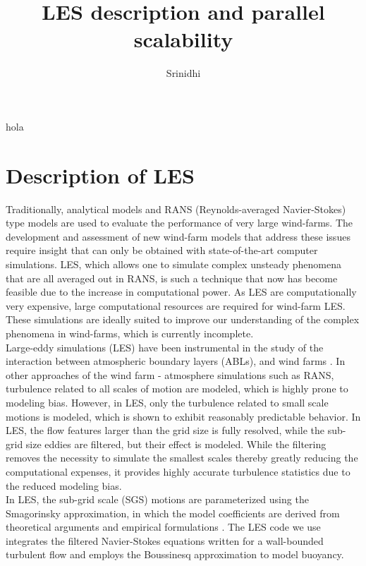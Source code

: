 \documentclass[output=paper,colorlinks,citecolor=brown]{langscibook}
\author{Srinidhi}
\title{LES description and parallel scalability}
\begin{document}
\maketitle
hola
\section{Description of LES}
Traditionally, analytical models and RANS (Reynolds-averaged Navier-Stokes) type models are used to evaluate the performance of very large wind-farms. The development and assessment of new wind-farm models that address these issues require insight that can only be obtained with state-of-the-art computer simulations. LES, which allows one to simulate complex unsteady phenomena that are all averaged out in RANS, is such a technique that now has become feasible due to the increase in computational power. As LES are computationally very expensive, large computational resources are required for wind-farm LES. These simulations are ideally suited to improve our understanding of the complex phenomena in wind-farms, which is currently incomplete.\\ 

Large-eddy simulations (LES) have been instrumental in the study of the interaction between atmospheric boundary layers (ABLs), and wind farms \citep{ste17, por20}. In other approaches of the wind farm - atmosphere simulations such as RANS, turbulence related to all scales of motion are modeled, which is highly prone to modeling bias. However, in LES, only the turbulence related to small scale motions is modeled, which is shown to exhibit reasonably predictable behavior. In LES, the flow features larger than the grid size is fully resolved, while the sub-grid size eddies are filtered, but their effect is modeled. While the filtering removes the necessity to simulate the smallest scales thereby greatly reducing the computational expenses, it provides highly accurate turbulence statistics due to the reduced modeling bias.\\
In LES, the sub-grid scale (SGS) motions are parameterized using the Smagorinsky approximation, in which the model coefficients are derived from theoretical arguments and empirical formulations \citep{sma67}. The LES code we use integrates the filtered Navier-Stokes equations written for a wall-bounded turbulent flow \citep{alb96} and employs the Boussinesq approximation to model buoyancy.\\
\end{document}
